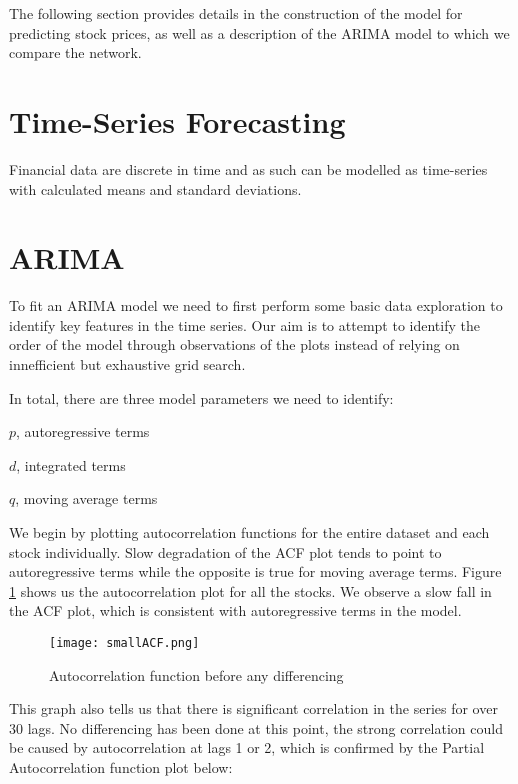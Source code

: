 \graphicspath{{./figures/}}

The following section provides details in the construction of the model for predicting stock prices, as well as a description of the ARIMA model to which we compare the network.

\section{Time-Series Forecasting}
Financial data are discrete in time and as such can be modelled as time-series with calculated means and standard deviations.

\section{ARIMA}
To fit an ARIMA model we need to first perform some basic data exploration to identify key features in the time series. Our aim is to attempt to identify the order of the model through observations of the plots instead of relying on innefficient but exhaustive grid search. 

In total, there are three model parameters we need to identify:
\begin{list}{--}{}%
    \item $p$, autoregressive terms
    \item $d$, integrated terms
    \item $q$, moving average terms
\end{list}%

We begin by plotting autocorrelation functions for the entire dataset and each stock individually. Slow degradation of the ACF plot tends to point to autoregressive terms while the opposite is true for moving average terms. Figure \ref{tab:smallACF} shows us the autocorrelation plot for all the stocks. We observe a slow fall in the ACF plot, which is consistent with autoregressive terms in the model.

\begin{figure}[H]
    \centering
    \texttt{[image: smallACF.png]}
    \caption{Autocorrelation function before any differencing}
    \label{tab:smallACF}    
\end{figure}

 This graph also tells us that there is significant correlation in the series for over 30 lags. No differencing has been done at this point, the strong correlation could be caused by autocorrelation at lags 1 or 2, which is confirmed by the Partial Autocorrelation function plot below:

